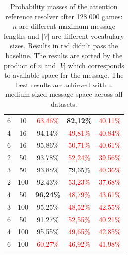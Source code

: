 \documentclass[11pt,a4paper]{article}
\begin{document}
\begin{table}[ht]
\begin{tabular}{cc|c|c|c}
    {6}                           & {10}      & \textcolor{red}{63,46\%}            & \textbf{82,12\%}                    & \textcolor{red}{40,11\%}           \\
    {4}                           & {16}      & {94,14\%}                           & \textcolor{red}{49,81\%}            & \textcolor{red}{40,84\%}           \\
    {6}                           & {16}      & {95,86\%}                           & \textcolor{red}{50,71\%}            & \textcolor{red}{40,61\%}           \\
    {2}                           & {50}      & {93,78\%}                           & \textcolor{red}{52,24\%}            & \textcolor{red}{39,56\%}           \\
    {3}                           & {50}      & {93,88\%}                           & {79,65\%}                           & \textcolor{red}{40,36\%}           \\
    {2}                           & {100}     & {92,43\%}                           & \textcolor{red}{53,23\%}            & \textcolor{red}{37,68\%}           \\
    {4}                           & {50}      & \textbf{96,24\%}                    & \textcolor{red}{48,79\%}            & \textcolor{red}{43,61\%}           \\
    {3}                           & {100}     & {95,25\%}                           & \textcolor{red}{48,52\%}            & \textcolor{red}{42,55\%}           \\
    {6}                           & {50}      & {91,27\%}                           & \textcolor{red}{52,55\%}            & \textcolor{red}{40,21\%}           \\
    {4}                           & {100}     & {95,55\%}                           & \textcolor{red}{49,65\%}            & \textcolor{red}{42,85\%}           \\
    {6}                           & {100}     & \textcolor{red}{60,27\%}            & \textcolor{red}{46,92\%}            & \textcolor{red}{41,98\%}           \\
    \bottomrule
  \end{tabular}
  \caption{Probability masses of the attention reference resolver after 128.000 games: $n$ are different maximum message lengths and $|V|$ are different vocabulary sizes. Results in red didn't pass the baseline. The results are sorted by the product of $n$ and $|V|$ which corresponds to available space for the message. The best results are achieved with a medium-sized message space across all datasets.}
  \label{tab:results:attention-reference-resolver-game}
\end{table}
\end{document}
